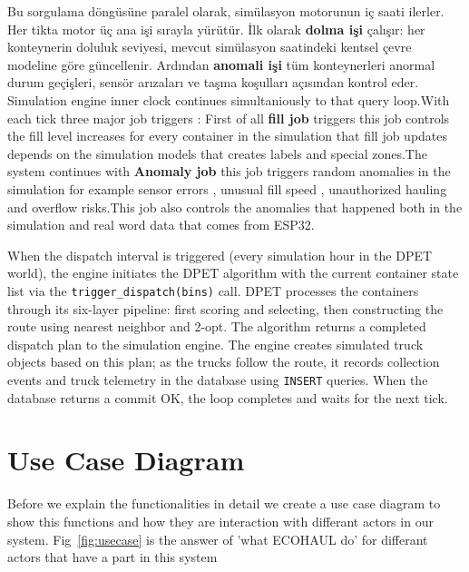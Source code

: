 \documentclass[12pt,a4paper]{report}
\begin{document}
\indent Bu sorgulama döngüsüne paralel olarak, simülasyon motorunun iç saati ilerler. Her tikta motor üç ana işi sırayla yürütür. İlk olarak \textbf{dolma işi} çalışır: her konteynerin doluluk seviyesi, mevcut simülasyon saatindeki kentsel çevre modeline göre güncellenir. Ardından \textbf{anomali işi} tüm konteynerleri anormal durum geçişleri, sensör arızaları ve taşma koşulları açısından kontrol eder.
\indent Simulation engine inner clock continues simultaniously to that query loop.With each tick three major job triggers : First of all \textbf{fill job} triggers this job controls the fill level increases for every container in the simulation that fill job updates depends on the simulation models that creates labels and special zones.The system continues with \textbf{Anomaly job} this job triggers random anomalies in the simulation for example sensor errors , unusual fill speed , unauthorized hauling  and overflow risks.This job also controls the anomalies that happened both in the simulation and real word data that comes from ESP32.

\indent When the dispatch interval is triggered (every simulation hour in the DPET world), the engine initiates the DPET algorithm with the current container state list via the \texttt{trigger\_dispatch(bins)} call. DPET processes the containers through its six-layer pipeline: first scoring and selecting, then constructing the route using nearest neighbor and 2-opt. The algorithm returns a completed dispatch plan to the simulation engine. The engine creates simulated truck objects based on this plan; as the trucks follow the route, it records collection events and truck telemetry in the database using \texttt{INSERT} queries. When the database returns a commit OK, the loop completes and waits for the next tick.

\section{Use Case Diagram}

\indent Before we explain the functionalities in detail we create a use case diagram to show this functions and how they are interaction with differant actors in our system. Fig~\ref{fig:usecase} is the answer of  'what ECOHAUL do' for differant actors that have a part in this system
\end{document}
